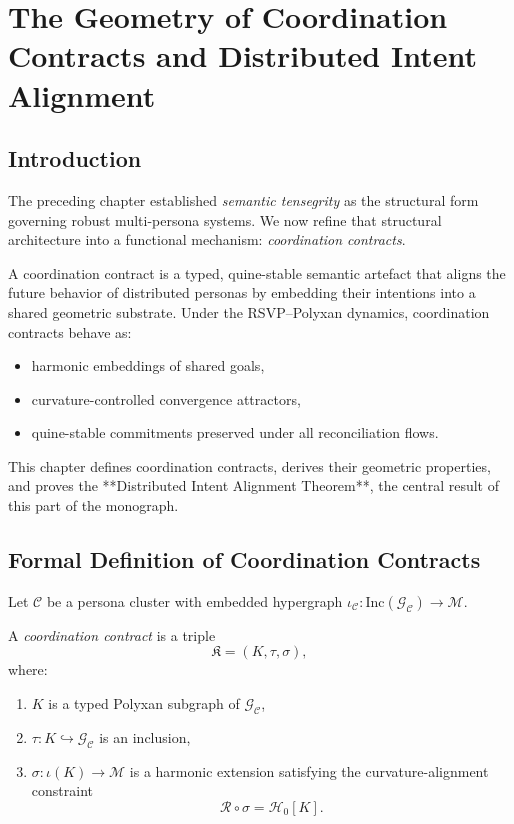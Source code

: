 \chapter{The Geometry of Coordination Contracts and Distributed Intent Alignment}
\label{ch:coordination-contracts}

\section{Introduction}

The preceding chapter established \emph{semantic tensegrity} as the structural form
governing robust multi-persona systems.
We now refine that structural architecture into a functional mechanism:
\emph{coordination contracts}.

A coordination contract is a typed, quine-stable semantic artefact
that aligns the future behavior of distributed personas by embedding
their intentions into a shared geometric substrate.
Under the RSVP--Polyxan dynamics,
coordination contracts behave as:
\begin{itemize}
    \item harmonic embeddings of shared goals,
    \item curvature-controlled convergence attractors,
    \item quine-stable commitments preserved under all reconciliation flows.
\end{itemize}

This chapter defines coordination contracts,
derives their geometric properties,
and proves the **Distributed Intent Alignment Theorem**,
the central result of this part of the monograph.


\section{Formal Definition of Coordination Contracts}

Let $\mathcal{C}$ be a persona cluster with embedded hypergraph
$\iota_{\mathcal{C}} : \mathrm{Inc}(\mathcal{G}_{\mathcal{C}}) \to \mathcal{M}$.

\begin{definition}
A \emph{coordination contract} is a triple
\[
\mathfrak{K} = (K, \tau, \sigma),
\]
where:
\begin{enumerate}
    \item $K$ is a typed Polyxan subgraph of $\mathcal{G}_{\mathcal{C}}$,
    \item $\tau : K \hookrightarrow \mathcal{G}_{\mathcal{C}}$ is an inclusion,
    \item $\sigma : \iota(K) \to \mathcal{M}$ is a harmonic extension
          satisfying the curvature-alignment constraint
          \[
          \mathcal{R}\circ \sigma = \mathcal{H}_0[K].
          \]
\end{enumerate}
\end{definition}

